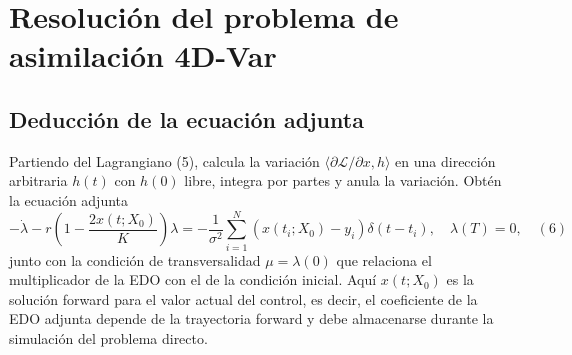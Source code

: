 \documentclass[12pt,spanish,mexico]{article}
\numberwithin{equation}{section}
\theoremstyle{definition}
\theoremstyle{remark}
\begin{document}
\section{Resolución del problema de asimilación 4D-Var}

\subsection{Deducción de la ecuación adjunta}
Partiendo del Lagrangiano (5), calcula la variación \(\langle \partial\mathcal{L}/\partial x, h \rangle\) en una dirección arbitraria \(h(t)\) con \(h(0)\) libre, integra por partes y anula la variación. Obtén la ecuación adjunta
\[
-\dot{\lambda} - r \left( 1 - \frac{2x(t; X_0)}{K} \right) \lambda = -\frac{1}{\sigma^2} \sum_{i=1}^{N} \left( x(t_i; X_0) - y_i \right) \delta(t - t_i), \quad \lambda(T) = 0, \quad (6)
\]
junto con la condición de transversalidad \(\mu = \lambda(0)\) que relaciona el multiplicador de la EDO con el de la condición inicial. Aquí \(x(t; X_0)\) es la solución forward para el valor actual del control, es decir, el coeficiente de la EDO adjunta depende de la trayectoria forward y debe almacenarse durante la simulación del problema directo.
\end{document}
